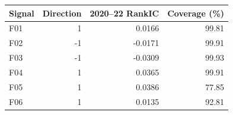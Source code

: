 \begin{tabular}{lrrr}
\toprule
Signal & Direction & 2020--22 RankIC & Coverage (\%) \\
\midrule
F01 & 1 & 0.0166 & 99.81 \\
F02 & -1 & -0.0171 & 99.91 \\
F03 & -1 & -0.0309 & 99.93 \\
F04 & 1 & 0.0365 & 99.91 \\
F05 & 1 & 0.0386 & 77.85 \\
F06 & 1 & 0.0135 & 92.81 \\
\bottomrule
\end{tabular}
